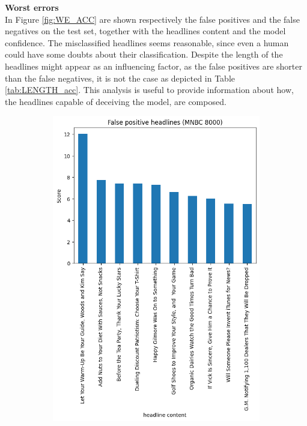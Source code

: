\documentclass{article}
\begin{document}
\begin{multicols}{2}
\noindent
\textbf{Worst errors} \\
In Figure \ref{fig:WE_ACC} are shown respectively the false positives and the false negatives
on the test set, together with the headlines content and the model confidence. The misclassified headlines seems reasonable, since even a 
human could have some doubts about their classification. Despite the length of the headlines might appear as an influencing factor, as the 
false positives are shorter than the false negatives, it is not the case as depicted in Table \ref{tab:LENGTH_acc}. This analysis is useful
to provide information about how, the headlines capable of deceiving the model, are composed.

    \begin{figure}[H]
        
        \begin{subfigure}{\linewidth}
        \centering
        \includegraphics[width=0.90\columnwidth]{Figures/false_pos_bestACC.png}
        \end{subfigure}
        

\end{figure}
\end{multicols}
\end{document}
